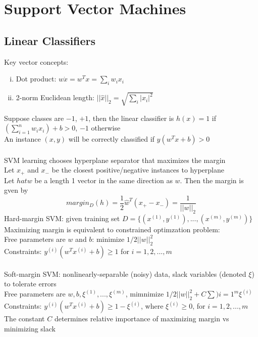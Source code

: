 \documentclass{article}
\begin{document}
	\section{Support Vector Machines}
		\subsection{Linear Classifiers}
			Key vector concepts:
			\begin{enumerate}[(i)]
				\item Dot product: $w \dot x = w^Tx = \sum_i w_ix_i$
				\item 2-norm Euclidean length: $||\hat{x}||_2 = \sqrt{\sum_i|x_i|^2}$
				\end{enumerate}
			Suppose classes are $-1$, $+1$, then the linear classifier is $h(x) = 1$ if $(\sum_{i =1}^nw_ix_i) + b > 0$, $-1$ otherwise \\
			An instance $(x, y)$ will be correctly classified if $y(w^Tx + b) > 0$ \\
			\\
			SVM learning chooses hyperplane separator that maximizes the margin \\
			Let $x_+$ and $x_-$ be the closest positive/negative instances to hyperplane \\
			Let $hat{w}$ be a length 1 vector in the same direction as $w$. Then the margin is gven by
			\begin{equation*}
				margin_D(h) = \frac{1}{2}\hat{w}^T(x_+ - x_-) = \frac{1}{||w||_2}
				\end{equation*}
			Hard-margin SVM: given training set $D = \{(x^{(1)}, y^{(1)}), ..., (x^{(m)}, y^{(m)})\}$ \\
			Maximizing margin is equivalent to constrained optimzation problem: \\
			Free parameters are $w$ and $b$: minimize $1/2||w||_2^2$ \\
			Constraints: $y^{(i)}(w^Tx^{(i)} + b) \geq 1$ for $i = 1, 2, ..., m$ \\
			\\
			Soft-margin SVM: nonlinearly-separable (noisy) data, slack variables (denoted $\xi$) to tolerate errors \\
			Free parameters are $w, b, \xi^{(1)}, ..., \xi^{(m)}$, mimnimize $1/2||w||_2^2 + C\sum){i = 1}^m\xi^{(i)}$ \\
			Constraints: $y^{(i)}(w^Tx^{(i)} + b) \geq 1 - \xi^{(i)}$, where $\xi^{(i)} \geq 0$, for $i = 1, 2, ..., m$ \\
			The constant $C$ determines relative importance of maximizing margin vs minimizing slack 
\end{document}
